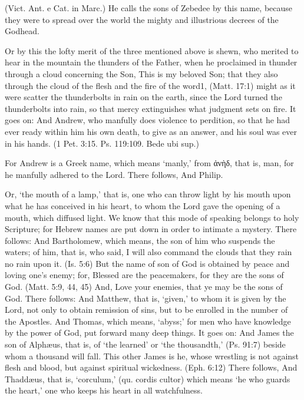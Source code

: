  (Vict. Ant. e Cat. in Marc.) He calls the sons of Zebedee by this name, because they were to spread over the world the mighty and illustrious decrees of the Godhead.

 Or by this the lofty merit of the three mentioned above is shewn, who merited to hear in the mountain the thunders of the Father, when he proclaimed in thunder through a cloud concerning the Son, This is my beloved Son; that they also through the cloud of the flesh and the fire of the word1, (Matt. 17:1) might as it were scatter the thunderbolts in rain on the earth, since the Lord turned the thunderbolts into rain, so that mercy extinguishes what judgment sets on fire. It goes on: And Andrew, who manfully does violence to perdition, so that he had ever ready within him his own death, to give as an answer, and his soul was ever in his hands. (1 Pet. 3:15. Ps. 119:109. Bede ubi sup.)

 For Andrew is a Greek name, which means ‘manly,’ from \textgreek{ἀνὴδ}, that is, man, for he manfully adhered to the Lord. There follows, And Philip.

 Or, ‘the mouth of a lamp,’ that is, one who can throw light by his mouth upon what he has conceived in his heart, to whom the Lord gave the opening of a mouth, which diffused light. We know that this mode of speaking belongs to holy Scripture; for Hebrew names are put down in order to intimate a mystery. There follows: And Bartholomew, which means, the son of him who suspends the waters; of him, that is, who said, I will also command the clouds that they rain no rain upon it. (Is. 5:6) But the name of son of God is obtained by peace and loving one’s enemy; for, Blessed are the peacemakers, for they are the sons of God. (Matt. 5:9, 44, 45) And, Love your enemies, that ye may be the sons of God. There follows: And Matthew, that is, ‘given,’ to whom it is given by the Lord, not only to obtain remission of sins, but to be enrolled in the number of the Apostles. And Thomas, which means, ‘abyss;’ for men who have knowledge by the power of God, put forward many deep things. It goes on: And James the son of Alphæus, that is, of ‘the learned’ or ‘the thousandth,’ (Ps. 91:7) beside whom a thousand will fall. This other James is he, whose wrestling is not against flesh and blood, but against spiritual wickedness. (Eph. 6:12) There follows, And Thaddæus, that is, ‘corculum,’ (qu. cordis cultor) which means ‘he who guards the heart,’ one who keeps his heart in all watchfulness.

